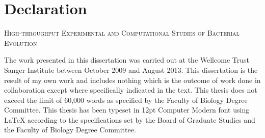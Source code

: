 
\chapter{Declaration}

%
\begin{center}
	\textsc{High-throughput Experimental and Computational Studies of Bacterial Evolution}
\end{center}

The work presented in this dissertation was carried out at the Wellcome Trust Sanger Institute between October 2009 and August 2013. This dissertation is the result of my own work and includes nothing which is the outcome of work done in collaboration except where specifically indicated in the text. This thesis does not exceed the limit of 60,000 words as specified by the Faculty of Biology Degree Committee. This thesis has been typeset in 12pt Computer Modern font using \LaTeX{} according to the specifications set by the Board of Graduate Studies and the Faculty of Biology Degree Committee.
%


